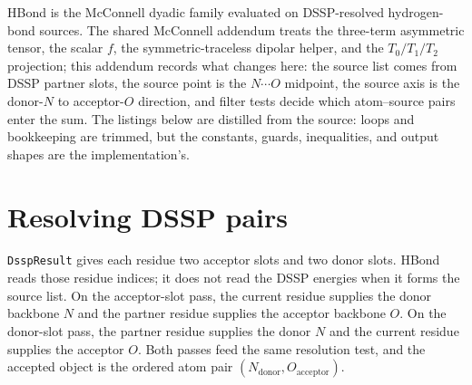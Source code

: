 \documentclass[11pt]{article}
\newcommand{\code}[1]{\texttt{#1}}
\begin{document}

HBond is the McConnell dyadic family evaluated on DSSP-resolved hydrogen-bond
sources. The shared McConnell addendum treats the three-term asymmetric tensor,
the scalar \(f\), the symmetric-traceless dipolar helper, and the
\(T_0/T_1/T_2\) projection; this addendum records what changes here: the source
list comes from DSSP partner slots, the source point is the \(N\cdots O\)
midpoint, the source axis is the donor-\(N\) to acceptor-\(O\) direction, and
filter tests decide which atom--source pairs enter the sum. The listings below
are distilled from the source: loops and bookkeeping are trimmed, but the
constants, guards, inequalities, and output shapes are the implementation's.

\section{Resolving DSSP pairs}

\code{DsspResult} gives each residue two acceptor slots and two donor slots.
HBond reads those residue indices; it does not read the DSSP energies when it
forms the source list. On the acceptor-slot pass, the current residue
supplies the donor backbone \(N\) and the partner residue supplies the acceptor
backbone \(O\). On the donor-slot pass, the partner residue supplies the donor
\(N\) and the current residue supplies the acceptor \(O\). Both passes feed the
same resolution test, and the accepted object is the ordered atom pair
\((N_{\mathrm{donor}},O_{\mathrm{acceptor}})\).
\end{document}
